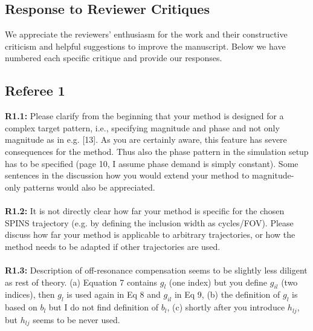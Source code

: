 \documentclass[11pt]{article}
\newcommand{\mysubsectionstar}[1]{\vspace{0mm}\subsection*{#1}\vspace{0mm}}
\begin{document}


\onecolumn

\setlength{\parskip}{0pt}

\clearpage
\newpage
\pagestyle{empty}		%

\footskip 15pt

\mysubsectionstar{Response to Reviewer Critiques}
We appreciate the reviewers' enthusiasm for the work and their constructive criticism and helpful suggestions to improve the manuscript.
Below we have numbered each specific critique and provide our responses.

\mysubsectionstar{Referee 1}
{\bf R1.1:} Please clarify from the beginning that your method is designed for a complex target pattern, i.e., specifying magnitude and phase and not only magnitude as in e.g. [13]. As you are certainly aware, this feature has severe consequences for the method. Thus also the phase pattern in the simulation setup has to be specified (page 10, I assume phase demand is simply constant). Some sentences in the discussion how you would extend your method to magnitude-only patterns would also be appreciated.
\\[0.2em] 
\indent{\it \textcolor{blue}{Done.}}
\\[1.2em]

{\bf R1.2:} It is not directly clear how far your method is specific for the chosen SPINS trajectory (e.g. by defining the inclusion width as cycles/FOV). Please discuss how far your method is applicable to arbitrary trajectories, or how the method needs to be adapted if other trajectories are used.
\\[0.2em]
\indent{\it \textcolor{blue}{Done.}}
\\[1.2em]

{\bf R1.3:} Description of off-resonance compensation seems to be slightly less diligent as rest of theory. (a) Equation 7 contains $g_l$ (one index) but you define $g_{il}$ (two indices), then $g_l$ is used again in Eq 8 and $g_{il}$ in Eq 9, (b) the definition of $g_l$ is based on $b_l$ but I do not find definition of $b_l$, (c) shortly after you introduce $h_{lj}$, but $h_{lj}$ seems to be never used.
\\[0.2em]
\indent{\it \textcolor{blue}{Done.}}
\end{document}
